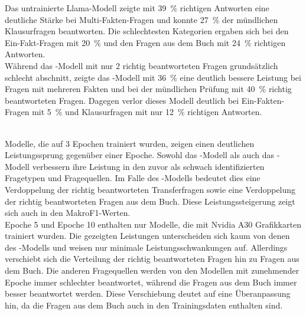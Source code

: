 Das untrainierte Llama-Modell zeigte mit \SI{39}{\percent} richtigen Antworten eine deutliche Stärke bei Multi-Fakten-Fragen und konnte \SI{27}{\percent} der mündlichen Klausurfragen beantworten.
Die schlechtesten Kategorien ergaben sich bei den Ein-Fakt-Fragen mit \SI{20}{\percent} und den Fragen aus dem Buch mit \SI{24}{\percent} richtigen Antworten.\\


Während das \liv-Modell mit nur 2 richtig beantworteten Fragen grundsätzlich schlecht abschnitt,
zeigte das \lia-Modell mit \SI{36}{\percent} eine deutlich bessere Leistung bei Fragen mit mehreren Fakten
und bei der mündlichen Prüfung mit \SI{40}{\percent} richtig beantworteten Fragen.
Dagegen verlor dieses Modell deutlich bei Ein-Fakten-Fragen mit \SI{5}{\percent} und Klausurfragen mit nur \SI{12}{\percent} richtigen Antworten.\\\


Modelle, die auf 3 Epochen trainiert wurden, zeigen einen deutlichen Leistungssprung gegenüber einer Epoche.
Sowohl das \lev-Modell als auch das \lea-Modell verbessern ihre Leistung in den zuvor als schwach identifizierten Fragetypen und Fragequellen.
Im Falle des \lea-Modells bedeutet dies eine Verdoppelung der richtig beantworteten Transferfragen sowie eine Verdoppelung der richtig beantworteten Fragen aus dem Buch.
Diese Leistungssteigerung zeigt sich auch in den MakroF1-Werten.\\

Epoche 5 und Epoche 10 enthalten nur Modelle, die mit Nvidia A30 Grafikkarten trainiert wurden.
Die gezeigten Leistungen unterscheiden sich kaum von denen des \lea-Modells und weisen nur minimale Leistungsschwankungen auf.
Allerdings verschiebt sich die Verteilung der richtig beantworteten Fragen hin zu Fragen aus dem Buch.
Die anderen Fragequellen werden von den Modellen mit zunehmender Epoche immer schlechter beantwortet, während die Fragen aus dem Buch immer besser beantwortet werden.
Diese Verschiebung deutet auf eine Überanpassung hin, da die Fragen aus dem Buch auch in den Trainingsdaten enthalten sind.\\

